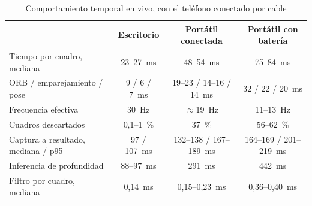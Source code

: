 \begin{table}[H]
\centering
\caption{Comportamiento temporal en vivo, con el teléfono conectado por cable}
\label{tab:res-tiempo-real}
\small
\begin{tabularx}{\textwidth}{@{}>{\raggedright\arraybackslash}X ccc@{}}
\toprule
& \textbf{Escritorio} & \textbf{Portátil conectada} & \textbf{Portátil con batería} \\
\midrule
Tiempo por cuadro, mediana & 23--27~ms & 48--54~ms & 75--84~ms \\
\quad ORB / emparejamiento / pose & 9 / 6 / 7~ms & 19--23 / 14--16 / 14~ms & 32 / 22 / 20~ms \\
Frecuencia efectiva & 30~Hz & $\approx$19~Hz & 11--13~Hz \\
Cuadros descartados & 0,1--1~\% & 37~\% & 56--62~\% \\
Captura a resultado, mediana / p95 & 97 / 107~ms & 132--138 / 167--189~ms & 164--169 / 201--219~ms \\
Inferencia de profundidad & 88--97~ms & 291~ms & 442~ms \\
Filtro por cuadro, mediana & 0,14~ms & 0,15--0,23~ms & 0,36--0,40~ms \\
\bottomrule
\end{tabularx}
\end{table}

